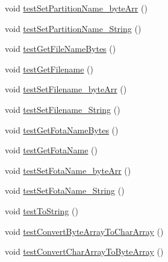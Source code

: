 \begin{DoxyCompactItemize}
\item 
void \hyperlink{classCASUAL_1_1archiving_1_1libpit_1_1PitEntryTest_a1a157659b5634814096c2c5ffdd43ded}{test\-Set\-Partition\-Name\-\_\-byte\-Arr} ()
\item 
void \hyperlink{classCASUAL_1_1archiving_1_1libpit_1_1PitEntryTest_af7c9086de89f4a3b42075a7883229edf}{test\-Set\-Partition\-Name\-\_\-\-String} ()
\item 
void \hyperlink{classCASUAL_1_1archiving_1_1libpit_1_1PitEntryTest_aa7160a596712ac7970e099fb7f412467}{test\-Get\-File\-Name\-Bytes} ()
\item 
void \hyperlink{classCASUAL_1_1archiving_1_1libpit_1_1PitEntryTest_a969d85946542c81609b263b22605dc80}{test\-Get\-Filename} ()
\item 
void \hyperlink{classCASUAL_1_1archiving_1_1libpit_1_1PitEntryTest_a51ed5c9497a20dbc7919c485754192cc}{test\-Set\-Filename\-\_\-byte\-Arr} ()
\item 
void \hyperlink{classCASUAL_1_1archiving_1_1libpit_1_1PitEntryTest_ae5ef720f553c58f06e218101fc1b90d7}{test\-Set\-Filename\-\_\-\-String} ()
\item 
void \hyperlink{classCASUAL_1_1archiving_1_1libpit_1_1PitEntryTest_ac5b132b75d7a9ca6ca4ea0636cc86b57}{test\-Get\-Fota\-Name\-Bytes} ()
\item 
void \hyperlink{classCASUAL_1_1archiving_1_1libpit_1_1PitEntryTest_afb2bfcf15987c221f3cb0c33bb48eba3}{test\-Get\-Fota\-Name} ()
\item 
void \hyperlink{classCASUAL_1_1archiving_1_1libpit_1_1PitEntryTest_a952d90ef3b2afa8976c3c2e70be7a2fe}{test\-Set\-Fota\-Name\-\_\-byte\-Arr} ()
\item 
void \hyperlink{classCASUAL_1_1archiving_1_1libpit_1_1PitEntryTest_ae03349cb60c30d2a7ccd06f4f3a16771}{test\-Set\-Fota\-Name\-\_\-\-String} ()
\item 
void \hyperlink{classCASUAL_1_1archiving_1_1libpit_1_1PitEntryTest_ae90fd0a8ad37b95eac06c93804c6ce29}{test\-To\-String} ()
\item 
void \hyperlink{classCASUAL_1_1archiving_1_1libpit_1_1PitEntryTest_a4067db1e45c315476970e0d9c0ea0477}{test\-Convert\-Byte\-Array\-To\-Char\-Array} ()
\item 
void \hyperlink{classCASUAL_1_1archiving_1_1libpit_1_1PitEntryTest_aed669209ec4c036e23c4afa978074b72}{test\-Convert\-Char\-Array\-To\-Byte\-Array} ()
\end{DoxyCompactItemize}
